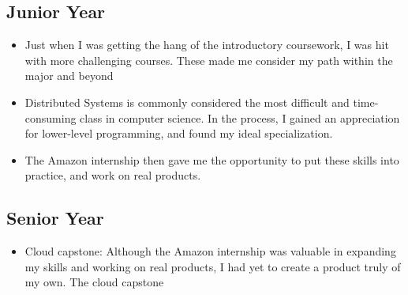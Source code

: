\documentclass{article}
\begin{document}
\subsection{Junior Year}
\begin{itemize}
    \item Just when I was getting the hang of the introductory coursework, I was hit with more challenging courses. These made me consider my path within the major and beyond
    \item Distributed Systems is commonly considered the most difficult and time-consuming class in computer science. In the process, I gained an appreciation for lower-level programming, and found my ideal specialization.
    \item The Amazon internship then gave me the opportunity to put these skills into practice, and work on real products.
\end{itemize}
\subsection{Senior Year}
\begin{itemize}
    \item Cloud capstone: Although the Amazon internship was valuable in expanding my skills and working on real products, I had yet to create a product truly of my own. The cloud capstone
\end{itemize}
\end{document}
